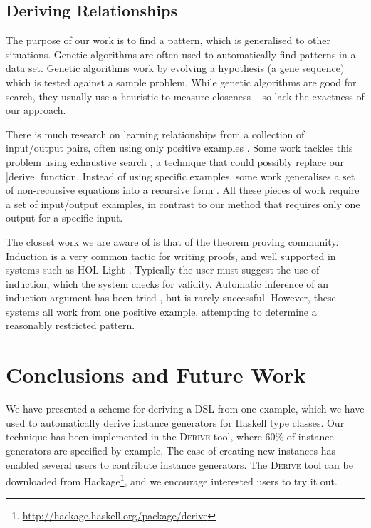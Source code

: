 \documentclass[preprint,draft]{sigplanconf}
\newcommand{\derive}{\textsc{Derive}}
\begin{document}
\subsection{Deriving Relationships}

The purpose of our work is to find a pattern, which is generalised to other situations. Genetic algorithms \cite{genetic_algorithms} are often used to automatically find patterns in a data set. Genetic algorithms work by evolving a hypothesis (a gene sequence) which is tested against a sample problem. While genetic algorithms are good for search, they usually use a heuristic to measure closeness -- so lack the exactness of our approach.

There is much research on learning relationships from a collection of input/output pairs, often using only positive examples \cite{kitzelmann:data_driven_induction_ground}. Some work tackles this problem using exhaustive search \cite{katayama:exhaustive_generation}, a technique that could possibly replace our |derive| function. Instead of using specific examples, some work generalises a set of non-recursive equations into a recursive form \cite{kitzelmann:inductive_synthesis,kitzelmann:data_driven_induction}. All these pieces of work require a set of input/output examples, in contrast to our method that requires only one output for a specific input.

The closest work we are aware of is that of the theorem proving community. Induction is a very common tactic for writing proofs, and well supported in systems such as HOL Light \cite{hol_light}. Typically the user must suggest the use of induction, which the system checks for validity. Automatic inference of an induction argument has been tried \cite{mintchev:reasoning}, but is rarely successful. However, these systems all work from one positive example, attempting to determine a reasonably restricted pattern.

\section{Conclusions and Future Work}
\label{sec:conclusion}

We have presented a scheme for deriving a DSL from one example, which we have used to automatically derive instance generators for Haskell type classes. Our technique has been implemented in the \derive{} tool, where 60\% of instance generators are specified by example. The ease of creating new instances has enabled several users to contribute instance generators. The \derive{} tool can be downloaded from Hackage\footnote{\url{http://hackage.haskell.org/package/derive}}, and we encourage interested users to try it out.
\end{document}
